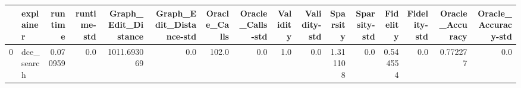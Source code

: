 \begin{tabular}{llrrrrrrrrrrrrrr}
\toprule
{} &   explainer &   runtime &  runtime-std &  Graph\_Edit\_Distance &  Graph\_Edit\_Distance-std &  Oracle\_Calls &  Oracle\_Calls-std &  Validity &  Validity-std &  Sparsity &  Sparsity-std &  Fidelity &  Fidelity-std &  Oracle\_Accuracy &  Oracle\_Accuracy-std \\
\midrule
0 &  dce\_search &  0.070959 &          0.0 &          1011.693069 &                      0.0 &         102.0 &               0.0 &       1.0 &           0.0 &  1.311108 &           0.0 &  0.544554 &           0.0 &         0.772277 &                  0.0 \\
\bottomrule
\end{tabular}
